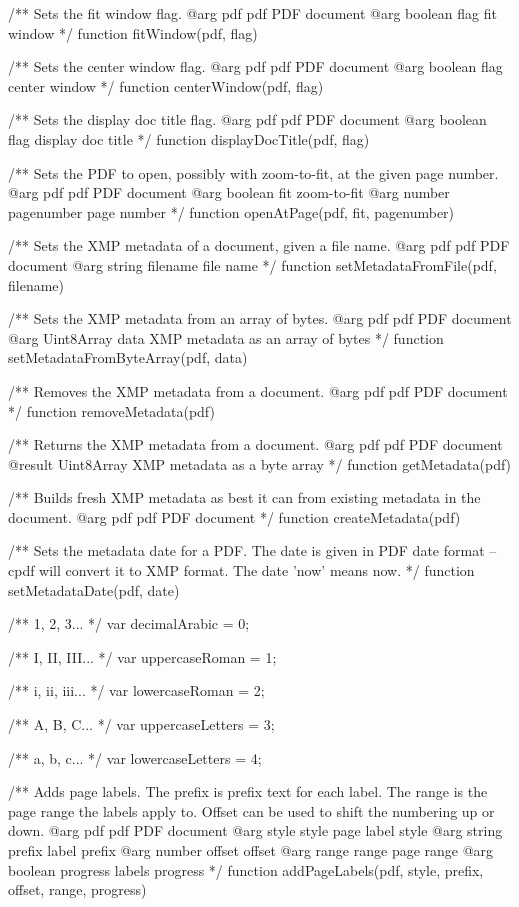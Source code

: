 /** Sets the fit window flag.
@arg {pdf} pdf PDF document
@arg {boolean} flag fit window */
function fitWindow(pdf, flag) {}

/** Sets the center window flag.
@arg {pdf} pdf PDF document
@arg {boolean} flag center window */
function centerWindow(pdf, flag) {}

/** Sets the display doc title flag.
@arg {pdf} pdf PDF document
@arg {boolean} flag display doc title */
function displayDocTitle(pdf, flag) {}

/** Sets the PDF to open, possibly with zoom-to-fit, at the given page
number.
@arg {pdf} pdf PDF document
@arg {boolean} fit zoom-to-fit
@arg {number} pagenumber page number */
function openAtPage(pdf, fit, pagenumber) {}

/** Sets the XMP metadata of a document, given a file name.
@arg {pdf} pdf PDF document
@arg {string} filename file name */
function setMetadataFromFile(pdf, filename) {}

/** Sets the XMP metadata from an array of bytes.
@arg {pdf} pdf PDF document
@arg {Uint8Array} data XMP metadata as an array of bytes */
function setMetadataFromByteArray(pdf, data) {}

/** Removes the XMP metadata from a document.
@arg {pdf} pdf PDF document */
function removeMetadata(pdf) {}

/** Returns the XMP metadata from a document.
@arg {pdf} pdf PDF document
@result {Uint8Array} XMP metadata as a byte array */
function getMetadata(pdf) {}

/** Builds fresh XMP metadata as best it can from existing metadata in the
document.
@arg {pdf} pdf PDF document */
function createMetadata(pdf) {}

/** Sets the metadata date for a PDF. The date is given in PDF date format --
cpdf will convert it to XMP format. The date 'now' means now. */
function setMetadataDate(pdf, date) {}

/** 1, 2, 3... */
var decimalArabic = 0;

/** I, II, III... */
var uppercaseRoman = 1;

/** i, ii, iii... */
var lowercaseRoman = 2;

/** A, B, C... */
var uppercaseLetters = 3;

/** a, b, c... */
var lowercaseLetters = 4;

/** Adds page labels. The prefix is prefix text for each label. The range is
the page range the labels apply to. Offset can be used to shift the numbering
up or down.
@arg {pdf} pdf PDF document
@arg {style} style page label style
@arg {string} prefix label prefix
@arg {number} offset offset
@arg {range} range page range
@arg {boolean} progress labels progress */
function addPageLabels(pdf, style, prefix, offset, range, progress) {}

